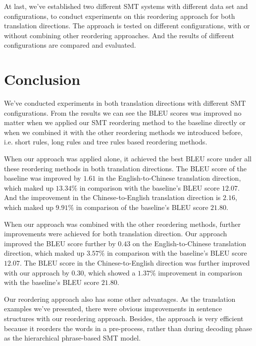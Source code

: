 At last, we've established two different \ac{SMT} systems with different data set and configurations, to conduct experiments on this reordering approach for both translation directions. The approach is tested on different configurations, with or without combining other reordering approaches. And the results of different configurations are compared and evaluated.

\section{Conclusion}
\label{ch:Discussion:sec:Conclusion}

We've conducted experiments in both translation directions with different \ac{SMT} configurations. From the results we can see the \ac{BLEU} scores was improved no matter when we applied our \ac{SMT} reordering method to the baseline directly or when we combined it with the other reordering methods we introduced before, i.e. short rules, long rules and tree rules based reordering methods.

When our approach was applied alone, it achieved the best \ac{BLEU} score under all these reordering methods in both translation directions. The \ac{BLEU} score of the baseline was improved by $1.61$ in the English-to-Chinese translation direction, which maked up $13.34\%$ in comparison with the baseline's \ac{BLEU} score $12.07$. And the improvement in the Chinese-to-English translation direction is $2.16$, which maked up $9.91\%$ in comparison of the baseline's \ac{BLEU} score $21.80$.

When our approach was combined with the other reordering methods, further improvements were achieved for both translation direction. Our approach improved the \ac{BLEU} score further by $0.43$ on the English-to-Chinese translation direction, which maked up $3.57\%$ in comparison with the baseline's \ac{BLEU} score $12.07$. The \ac{BLEU} score in the Chinese-to-English direction was further improved with our approach by $0.30$, which showed a $1.37\%$ improvement in comparison with the baseline's \ac{BLEU} score $21.80$.

Our reordering approach also has some other advantages. As the translation examples we've presented, there were obvious improvements in sentence structures with our reordering approach. Besides, the approach is very efficient because it reorders the words in a pre-process, rather than during decoding phase as the hierarchical phrase-based SMT model. 

